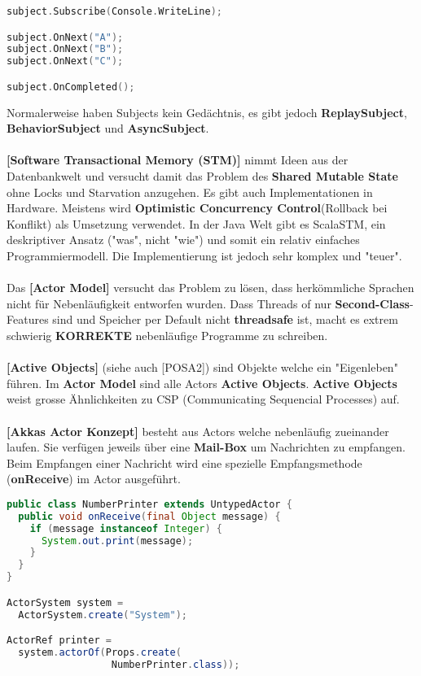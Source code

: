 \documentclass[8pt]{extarticle}
\let\oldtextbf\textbf
\renewcommand{\textbf}{\tiny\oldtextbf}
\begin{document}
\begin{multicols*}{5}
\begin{lstlisting}[language=c++]
subject.Subscribe(Console.WriteLine);

subject.OnNext("A");
subject.OnNext("B");
subject.OnNext("C");

subject.OnCompleted();
\end{lstlisting}
Normalerweise haben Subjects kein Gedächtnis, es gibt jedoch \textbf{ReplaySubject}, \textbf{BehaviorSubject} und \textbf{AsyncSubject}.\\\\
\textbf{[Software Transactional Memory (STM)]} nimmt Ideen aus der Datenbankwelt und versucht damit das Problem des \textbf{Shared Mutable State} ohne Locks und Starvation anzugehen. Es gibt auch Implementationen in Hardware. Meistens wird \textbf{Optimistic Concurrency Control}(Rollback bei Konflikt) als Umsetzung verwendet. In der Java Welt gibt es ScalaSTM, ein deskriptiver Ansatz ("was", nicht "wie") und somit ein relativ einfaches Programmiermodell. Die Implementierung ist jedoch sehr komplex und "teuer".\\\\
Das \textbf{[Actor Model]} versucht das Problem zu lösen, dass herkömmliche Sprachen nicht für Nebenläufigkeit entworfen wurden. Dass Threads of nur \textbf{Second-Class}-Features sind und Speicher per Default nicht \textbf{threadsafe} ist, macht es extrem schwierig \textbf{KORREKTE} nebenläufige Programme zu schreiben.\\\\
\textbf{[Active Objects]} (siehe auch [POSA2]) sind Objekte welche ein "Eigenleben" führen. Im \textbf{Actor Model} sind alle Actors \textbf{Active Objects}. \textbf{Active Objects} weist grosse Ähnlichkeiten zu CSP (Communicating Sequencial Processes) auf.\\\\
\textbf{[Akkas Actor Konzept]} besteht aus Actors welche nebenläufig zueinander laufen. Sie verfügen jeweils über eine \textbf{Mail-Box} um Nachrichten zu empfangen. Beim Empfangen einer Nachricht wird eine spezielle Empfangsmethode (\textbf{onReceive}) im Actor ausgeführt.
\begin{lstlisting}[language=java]
public class NumberPrinter extends UntypedActor {
  public void onReceive(final Object message) {
    if (message instanceof Integer) {
      System.out.print(message);
    }
  }
}

ActorSystem system =
  ActorSystem.create("System");

ActorRef printer =
  system.actorOf(Props.create(
                  NumberPrinter.class));


\end{lstlisting}
\end{multicols*}
\end{document}
